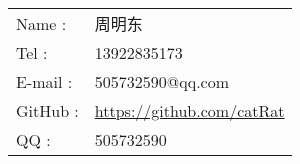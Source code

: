 \begin{tabular}{ll}
\hline
  Name : & 周明东 \\
  Tel : & 13922835173 \\
  E-mail : & 505732590@qq.com \\
  GitHub : & \url{https://github.com/catRat} \\
  QQ : & 505732590 \\
  \hline
\end{tabular}

